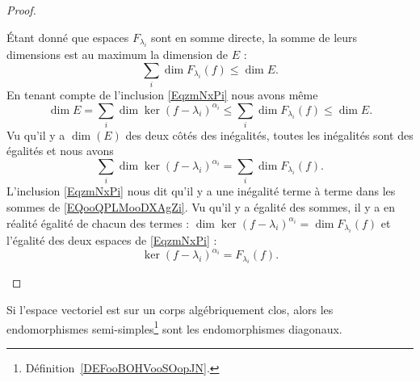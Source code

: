\begin{proof}
\begin{subproof}
		Étant donné que espaces \( F_{\lambda_i}\) sont en somme directe, la somme de leurs dimensions est au maximum la dimension de \( E\) :
		\begin{equation}
			\sum_i\dim F_{\lambda_i}(f)\leq \dim E.
		\end{equation}
		En tenant compte de l'inclusion \eqref{EqzmNxPi} nous avons même
		\begin{equation}
			\dim E=\sum_i\dim\ker(f-\lambda_i)^{\alpha_i}\leq\sum_i \dim F_{\lambda_i}(f)\leq \dim E.
		\end{equation}
		Vu qu'il y a \( \dim(E)\) des deux côtés des inégalités, toutes les inégalités sont des égalités et nous avons
		\begin{equation}        \label{EQooQPLMooDXAgZi}
			\sum_i\dim\ker(f-\lambda_i)^{\alpha_i}=\sum_i\dim F_{\lambda_i}(f).
		\end{equation}
		L'inclusion \eqref{EqzmNxPi} nous dit qu'il y a une inégalité terme à terme dans les sommes de \eqref{EQooQPLMooDXAgZi}. Vu qu'il y a égalité des sommes, il y a en réalité égalité de chacun des termes : \( \dim\ker(f-\lambda_i)^{\alpha_i}=\dim F_{\lambda_i}(f)\) et l'égalité des deux espaces de \eqref{EqzmNxPi} :
		\begin{equation}
			\ker(f-\lambda_i)^{\alpha_i}=F_{\lambda_i}(f).
		\end{equation}
	\end{subproof}
\end{proof}


Si l'espace vectoriel est sur un corps algébriquement clos, alors les endomorphismes semi-simples\footnote{Définition~\ref{DEFooBOHVooSOopJN}.} sont les endomorphismes diagonaux.


